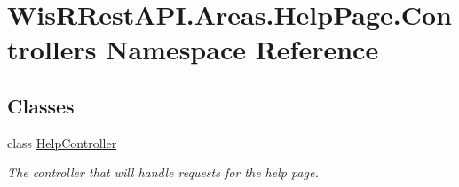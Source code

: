 \hypertarget{namespace_wis_r_rest_a_p_i_1_1_areas_1_1_help_page_1_1_controllers}{}\section{Wis\+R\+Rest\+A\+P\+I.\+Areas.\+Help\+Page.\+Controllers Namespace Reference}
\label{namespace_wis_r_rest_a_p_i_1_1_areas_1_1_help_page_1_1_controllers}
\subsection*{Classes}
\begin{DoxyCompactItemize}
\item 
class \hyperlink{class_wis_r_rest_a_p_i_1_1_areas_1_1_help_page_1_1_controllers_1_1_help_controller}{Help\+Controller}
\begin{DoxyCompactList}\small\item\em The controller that will handle requests for the help page. \end{DoxyCompactList}\end{DoxyCompactItemize}
